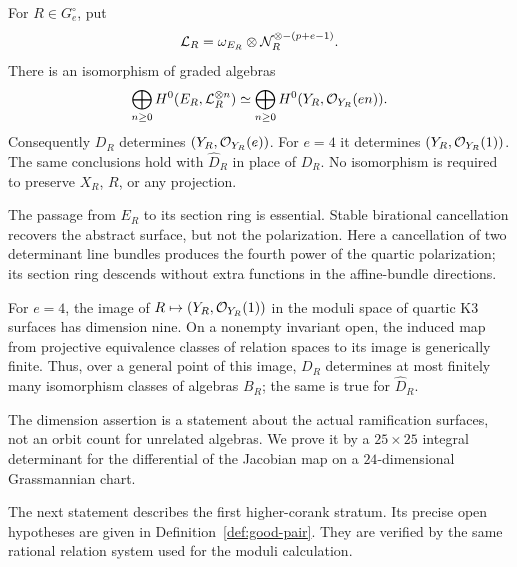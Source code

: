 \begin{theorem}\label{thm:main-reconstruction}
For $R\in G_e^\circ$, put
\[
 \mathcal L_R=\omega_{E_R}\otimes\mathcal N_R^{\otimes-(p+e-1)}.
\]
There is an isomorphism of graded algebras
\begin{equation}\label{eq:main-ring}
 \bigoplus_{n\ge0}H^0(E_R,\mathcal L_R^{\otimes n})
 \simeq
 \bigoplus_{n\ge0}H^0(Y_R,\mathcal O_{Y_R}(en)).
\end{equation}
Consequently $D_R$ determines $(Y_R,\mathcal O_{Y_R}(e))$.
For $e=4$ it determines $(Y_R,\mathcal O_{Y_R}(1))$.
The same conclusions hold with $\widehat D_R$ in place of $D_R$.
No isomorphism is required to preserve $X_R$, $R$, or any projection.
\end{theorem}

The passage from $E_R$ to its section ring is essential. Stable
birational cancellation recovers the abstract surface, but not the
polarization. Here a cancellation of two determinant line bundles
produces the fourth power of the quartic polarization; its section
ring descends without extra functions in the affine-bundle directions.

\begin{theorem}\label{thm:main-moduli}
For $e=4$, the image of
$R\mapsto(Y_R,\mathcal O_{Y_R}(1))$ in the moduli space of quartic K3
surfaces has dimension nine. On a nonempty invariant open, the induced
map from projective equivalence classes of relation spaces to its image
is generically finite. Thus, over a general point of this image,
$D_R$ determines at most finitely many isomorphism classes of algebras
$B_R$; the same is true for $\widehat D_R$.
\end{theorem}

The dimension assertion is a statement about the actual ramification
surfaces, not an orbit count for unrelated algebras. We prove it by a
$25\times25$ integral determinant for the differential of the
Jacobian map on a $24$-dimensional Grassmannian chart.

The next statement describes the first higher-corank stratum. Its
precise open hypotheses are given in Definition~\ref{def:good-pair}.
They are verified by the same rational relation system used for the
moduli calculation.

